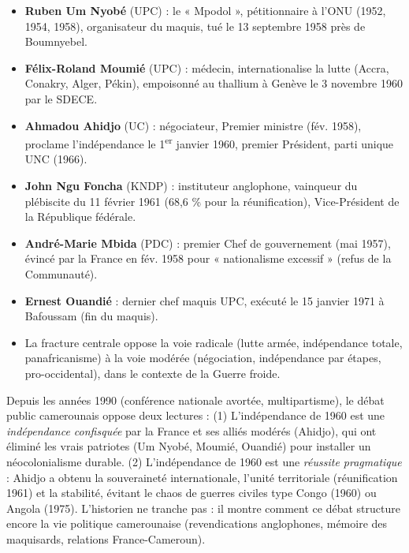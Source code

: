 \documentclass[11pt]{article}
\newcommand{\cle}[1]{{\popxbold\color{popdark}#1}}
\begin{document}
\begin{aretenir}
\begin{itemize}
\item \textbf{Ruben Um Nyobé} (UPC) : le « Mpodol », pétitionnaire à l'ONU (1952, 1954, 1958), organisateur du maquis, tué le 13 septembre 1958 près de Boumnyebel.
\item \textbf{Félix-Roland Moumié} (UPC) : médecin, internationalise la lutte (Accra, Conakry, Alger, Pékin), empoisonné au thallium à Genève le 3 novembre 1960 par le SDECE.
\item \textbf{Ahmadou Ahidjo} (UC) : négociateur, Premier ministre (fév. 1958), proclame l'indépendance le 1\textsuperscript{er} janvier 1960, premier Président, parti unique UNC (1966).
\item \textbf{John Ngu Foncha} (KNDP) : instituteur anglophone, vainqueur du plébiscite du 11 février 1961 (68,6 \% pour la réunification), Vice-Président de la République fédérale.
\item \textbf{André-Marie Mbida} (PDC) : premier Chef de gouvernement (mai 1957), évincé par la France en fév. 1958 pour « nationalisme excessif » (refus de la Communauté).
\item \textbf{Ernest Ouandié} : dernier chef maquis UPC, exécuté le 15 janvier 1971 à Bafoussam (fin du maquis).
\item La fracture centrale oppose la voie \cle{radicale} (lutte armée, indépendance totale, panafricanisme) à la voie \cle{modérée} (négociation, indépendance par étapes, pro-occidental), dans le contexte de la Guerre froide.
\end{itemize}
\end{aretenir}

\begin{savaistu}
Depuis les années 1990 (conférence nationale avortée, multipartisme), le débat public camerounais oppose deux lectures : (1) L'indépendance de 1960 est une \emph{indépendance confisquée} par la France et ses alliés modérés (Ahidjo), qui ont éliminé les vrais patriotes (Um Nyobé, Moumié, Ouandié) pour installer un néocolonialisme durable. (2) L'indépendance de 1960 est une \emph{réussite pragmatique} : Ahidjo a obtenu la souveraineté internationale, l'unité territoriale (réunification 1961) et la stabilité, évitant le chaos de guerres civiles type Congo (1960) ou Angola (1975). L'historien ne tranche pas : il montre comment ce débat structure encore la vie politique camerounaise (revendications anglophones, mémoire des maquisards, relations France-Cameroun).
\end{savaistu}
\end{document}
